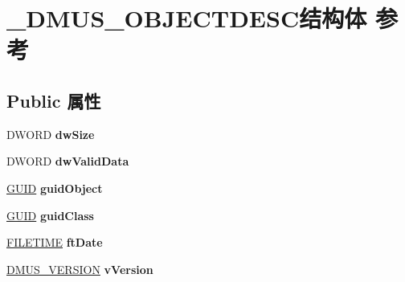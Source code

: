 \hypertarget{struct___d_m_u_s___o_b_j_e_c_t_d_e_s_c}{}\section{\+\_\+\+D\+M\+U\+S\+\_\+\+O\+B\+J\+E\+C\+T\+D\+E\+S\+C结构体 参考}
\label{struct___d_m_u_s___o_b_j_e_c_t_d_e_s_c}
\subsection*{Public 属性}
\begin{DoxyCompactItemize}
\item 
\mbox{\label{struct___d_m_u_s___o_b_j_e_c_t_d_e_s_c_a27f5bce6ae992281c8691b6dbda6d5cc}} 
D\+W\+O\+RD {\bfseries dw\+Size}
\item 
\mbox{\label{struct___d_m_u_s___o_b_j_e_c_t_d_e_s_c_ae77eb927c9721fbdf843b1771d7775da}} 
D\+W\+O\+RD {\bfseries dw\+Valid\+Data}
\item 
\mbox{\label{struct___d_m_u_s___o_b_j_e_c_t_d_e_s_c_aa3d8381df641667b4f72ce30af734b49}} 
\hyperlink{interface_g_u_i_d}{G\+U\+ID} {\bfseries guid\+Object}
\item 
\mbox{\label{struct___d_m_u_s___o_b_j_e_c_t_d_e_s_c_a279eb990f3f1ad5de266fe5fac2036eb}} 
\hyperlink{interface_g_u_i_d}{G\+U\+ID} {\bfseries guid\+Class}
\item 
\mbox{\label{struct___d_m_u_s___o_b_j_e_c_t_d_e_s_c_ac4e9efeda646a0b5b42816123689b790}} 
\hyperlink{struct___f_i_l_e_t_i_m_e}{F\+I\+L\+E\+T\+I\+ME} {\bfseries ft\+Date}
\item 
\mbox{\label{struct___d_m_u_s___o_b_j_e_c_t_d_e_s_c_a7f5781f589586ec8e779680b4b24f695}} 
\hyperlink{struct___d_m_u_s___v_e_r_s_i_o_n}{D\+M\+U\+S\+\_\+\+V\+E\+R\+S\+I\+ON} {\bfseries v\+Version}
\item 
\mbox{\label{struct___d_m_u_s___o_b_j_e_c_t_d_e_s_c_af1d4fe84089aa6214ca7db1da4f5401c}} 

\end{DoxyCompactItemize}
